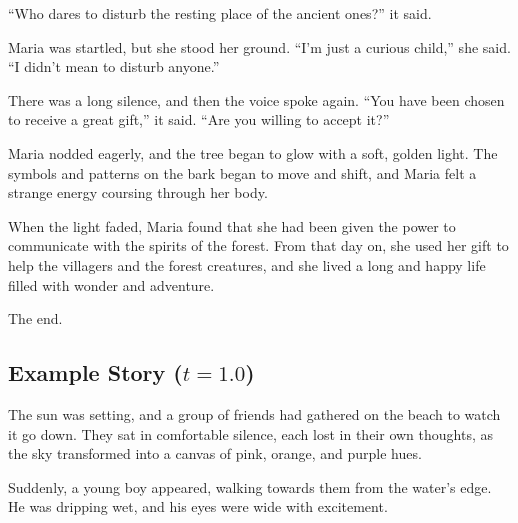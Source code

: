 \documentclass[a4paper]{article}
\begin{document}
\hspace{10pt} ``Who dares to disturb the resting place of the ancient ones?'' it said.
\vspace{1ex}

\hspace{10pt} Maria was startled, but she stood her ground. ``I'm just a curious child,'' she said. ``I didn't mean to disturb anyone.''
\vspace{1ex}

\hspace{10pt} There was a long silence, and then the voice spoke again. ``You have been chosen to receive a great gift,'' it said. ``Are you willing to accept it?''
\vspace{1ex}

\hspace{10pt} Maria nodded eagerly, and the tree began to glow with a soft, golden light. The symbols and patterns on the bark began to move and shift, and Maria felt a strange energy coursing through her body.
\vspace{1ex}

\hspace{10pt} When the light faded, Maria found that she had been given the power to communicate with the spirits of the forest. From that day on, she used her gift to help the villagers and the forest creatures, and she lived a long and happy life filled with wonder and adventure.
\vspace{1ex}

\hspace{10pt} The end.
\vspace{2ex}

\rmfamily

\newpage
\subsection*{Example Story ($t = 1.0$)}\label{app:example-t1}

\sffamily
\small

\vspace{1ex}
The sun was setting, and a group of friends had gathered on the beach to watch it go down. They sat in comfortable silence, each lost in their own thoughts, as the sky transformed into a canvas of pink, orange, and purple hues.
\vspace{1ex}

\hspace{10pt} Suddenly, a young boy appeared, walking towards them from the water's edge. He was dripping wet, and his eyes were wide with excitement.
\vspace{1ex}
\end{document}
